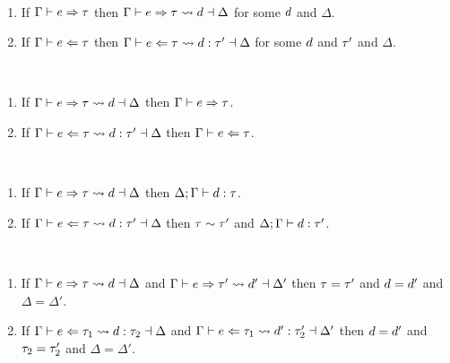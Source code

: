 \begin{theorem}[Expandability \cy{??}] ~
  \begin{enumerate}
    \item If $\Gamma \vdash e \Rightarrow \tau$ then $\Gamma \vdash e \Rightarrow \tau \leadsto d \dashv \Delta$ for some $d$ and $\Delta$.
    \item If $\Gamma \vdash e \Leftarrow \tau$ then $\Gamma \vdash e \Leftarrow \tau \leadsto d : \tau' \dashv \Delta$ for some $d$ and $\tau'$ and $\Delta$.
  \end{enumerate}
\end{theorem}

\begin{theorem}[Correspondence \cy{??}] ~
  \begin{enumerate}
    \item If $\Gamma \vdash e \Rightarrow \tau \leadsto d \dashv \Delta$ then $\Gamma \vdash e \Rightarrow \tau$.
    \item If $\Gamma \vdash e \Leftarrow \tau \leadsto d : \tau' \dashv \Delta$ then $\Gamma \vdash e \Leftarrow \tau$.
  \end{enumerate}
\end{theorem}

\begin{theorem} ~
  \begin{enumerate}
    \item If $\Gamma \vdash e \Rightarrow \tau \leadsto d \dashv \Delta$ then $\Delta; \Gamma \vdash d : \tau$.
    \item If $\Gamma \vdash e \Leftarrow \tau \leadsto d : \tau' \dashv \Delta$ then $\tau \sim \tau'$ and $\Delta; \Gamma \vdash d : \tau'$.
  \end{enumerate}
\end{theorem}

\begin{theorem} ~
  \begin{enumerate}
    \item If $\Gamma \vdash e \Rightarrow \tau \leadsto d \dashv \Delta$ and $\Gamma \vdash e \Rightarrow \tau' \leadsto d' \dashv \Delta'$ then $\tau=\tau'$ and $d=d'$ and $\Delta=\Delta'$.
    \item If $\Gamma \vdash e \Leftarrow \tau_1 \leadsto d : \tau_2 \dashv \Delta$ and $\Gamma \vdash e \Leftarrow \tau_1 \leadsto d' : \tau_2' \dashv \Delta'$ then $d=d'$ and $\tau_2=\tau_2'$ and $\Delta=\Delta'$.
  \end{enumerate}
\end{theorem}

